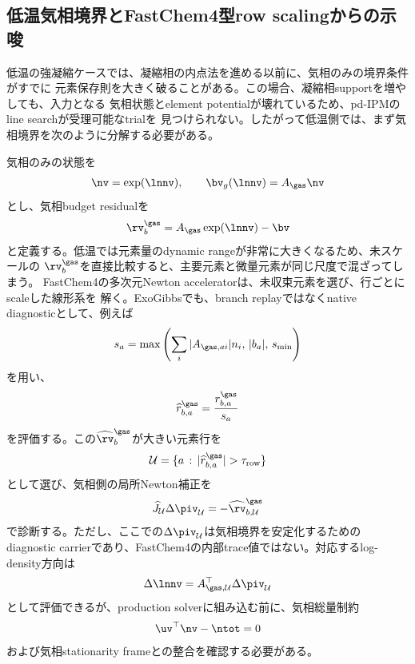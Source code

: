 \subsection*{低温気相境界とFastChem4型row scalingからの示唆}

低温の強凝縮ケースでは、凝縮相の内点法を進める以前に、気相のみの境界条件がすでに
元素保存則を大きく破ることがある。この場合、凝縮相supportを増やしても、入力となる
気相状態とelement potentialが壊れているため、pd-IPMのline searchが受理可能なtrialを
見つけられない。したがって低温側では、まず気相境界を次のように分解する必要がある。

気相のみの状態を
\begin{align}
    \nv = \exp(\lnnv),\qquad
    \bv_g(\lnnv) = A_\gas \nv
\end{align}
とし、気相budget residualを
\begin{align}
    \rv_b^{\gas} = A_\gas \exp(\lnnv) - \bv
\end{align}
と定義する。低温では元素量のdynamic rangeが非常に大きくなるため、未スケールの
$\rv_b^{\gas}$を直接比較すると、主要元素と微量元素が同じ尺度で混ざってしまう。
FastChem4の多次元Newton acceleratorは、未収束元素を選び、行ごとにscaleした線形系を
解く。ExoGibbsでも、branch replayではなくnative diagnosticとして、例えば
\begin{align}
    s_a =
    \max\left(
        \sum_i |A_{\gas,a i}| n_i,\,
        |b_a|,\,
        s_{\min}
    \right)
\end{align}
を用い、
\begin{align}
    \widehat r_{b,a}^{\gas} = \frac{r_{b,a}^{\gas}}{s_a}
\end{align}
を評価する。この$\widehat \rv_b^{\gas}$が大きい元素行を
\begin{align}
    \mathcal{U} = \{a\,:\,|\widehat r_{b,a}^{\gas}| > \tau_{\rm row}\}
\end{align}
として選び、気相側の局所Newton補正を
\begin{align}
    \widehat J_{\mathcal{U}} \Delta \piv_{\mathcal{U}}
    =
    -\widehat \rv_{b,\mathcal{U}}^{\gas}
\end{align}
で診断する。ただし、ここでの$\Delta\piv_{\mathcal{U}}$は気相境界を安定化するための
diagnostic carrierであり、FastChem4の内部trace値ではない。対応するlog-density方向は
\begin{align}
    \Delta \lnnv
    =
    A_{\gas,\mathcal{U}}^\top \Delta \piv_{\mathcal{U}}
\end{align}
として評価できるが、production solverに組み込む前に、気相総量制約
\begin{align}
    \uv^\top \nv - \ntot = 0
\end{align}
および気相stationarity frameとの整合を確認する必要がある。

